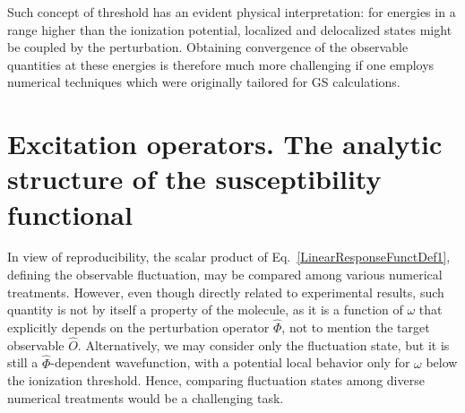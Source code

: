 \documentclass[reprint,aps,prb]{revtex4-1}
\newcommand{\op}[1]{\hat {#1}}
\begin{document}
Such concept of threshold has an evident physical interpretation: for energies in a range higher than the ionization potential,
localized and delocalized states might be coupled by the perturbation. Obtaining convergence of the observable quantities at these energies is therefore much more challenging if one employs 
numerical techniques which were originally tailored for GS calculations.

\section{Excitation operators. The analytic structure of the susceptibility functional}

In view of reproducibility, the scalar product of Eq.~\eqref{LinearResponseFunctDef1}, defining the observable fluctuation, may be compared among various numerical treatments.
However, even though directly related to experimental results, such quantity is not by itself a property of the molecule, as it is a function of $\omega$ that explicitly depends 
on the perturbation operator $\op \Phi$, not to mention the target observable $\op O$. Alternatively, we may consider only the fluctuation state, but it is still a $\op \Phi$-dependent wavefunction, 
with a potential local behavior only for $\omega$ below the ionization threshold. Hence, comparing fluctuation states among diverse numerical treatments would be a 
challenging task.
\end{document}
